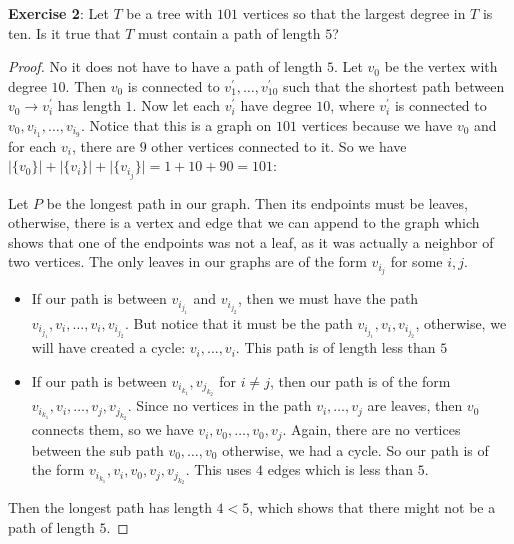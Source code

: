 \documentclass{article}
\begin{document}
\textbf{Exercise 2}: Let $T$ be a tree with $101$ vertices so that the largest degree in $T$ is ten. Is it true that $T$ must contain a path of length $5$?
    \begin{proof}
        No it does not have to have a path of length $5$. Let $v_{0}$ be the vertex with degree $10$. Then $v_{0}$ is connected to $v^{\prime}_{1}, \ldots, v^{\prime}_{10}$ such that the shortest path between $v_{0} \rightarrow v^{\prime}_{i}$ has length $1$. Now let each $v^{\prime}_{i}$ have degree $10$, where $v_{i}^{\prime}$ is connected to $v_{0}, v_{i_{1}}, \ldots, v_{i_{9}}$. Notice that this is a graph on $101$ vertices because we have $v_{0}$ and for each $v_{i}$, there are $9$ other vertices connected to it. So we have $\lvert \{v_{0}\} \rvert + \lvert \{v_{i}\} \rvert + \lvert \{v_{i_{j}}\} \rvert = 1 + 10 + 90 = 101$:
            \begin{fixedfigure}
            \end{fixedfigure}

        Let $P$ be the longest path in our graph. Then its endpoints must be leaves, otherwise, there is a vertex and edge that we can append to the graph which shows that one of the endpoints was not a leaf, as it was actually a neighbor of two vertices. The only leaves in our graphs are of the form $v_{i_{j}}$ for some $i, j$. 
            \begin{itemize}
                \item If our path is between $v_{i_{j_{1}}}$ and $v_{i_{j_{2}}}$, then we must have the path $v_{i_{j_{1}}}, v_{i}, \ldots, v_{i}, v_{i_{j_{2}}}$. But notice that it must be the path $v_{i_{j_{1}}}, v_{i}, v_{i_{j_{2}}}$, otherwise, we will have created a cycle: $v_{i}, \ldots, v_{i}$. This path is of length less than $5$

                \item If our path is between $v_{i_{k_{1}}}, v_{j_{k_{2}}}$ for $i \neq j$, then our path is of the form $v_{i_{k_{1}}}, v_{i}, \ldots, v_{j}, v_{j_{k_{2}}}$. Since no vertices in the path $v_{i}, \ldots, v_{j}$ are leaves, then $v_{0}$ connects them, so we have $v_{i}, v_{0}, \ldots, v_{0}, v_{j}$. Again, there are no vertices between the sub path $v_{0}, \ldots, v_{0}$ otherwise, we had a cycle. So our path is of the form $v_{i_{k_{1}}}, v_{i}, v_{0}, v_{j}, v_{j_{k_{2}}}$. This uses $4$ edges which is less than $5$. 
            \end{itemize}
        Then the longest path has length $4 < 5$, which shows that there might not be a path of length $5$.
    \end{proof}
\end{document}
